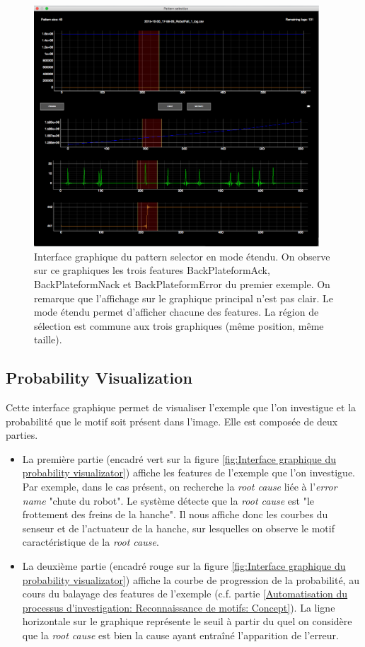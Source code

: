 \begin{figure}[H]
	\centering\includegraphics[height=9cm]{images/pattern_selector_ext.png}
	\caption[Interface graphique du pattern selector en mode étendu]{Interface graphique du pattern selector en mode étendu. On observe sur ce graphiques les trois features BackPlateformAck, BackPlateformNack et BackPlateformError du premier exemple. On remarque que l'affichage sur le graphique principal n'est pas clair. Le mode étendu permet d'afficher chacune des features. La région de sélection est commune aux trois graphiques (même position, même taille).}
	\label{fig:Interface graphique du pattern selector en mode étendu}
\end{figure}

\subsection{Probability Visualization}
\label{Industrialisation du produit: Outils graphiques: Probability Visualization}
Cette interface graphique permet de visualiser l'exemple que l'on investigue et la probabilité que le motif soit présent dans l'image. Elle est composée de deux parties. 
\begin{itemize}
	\item La première partie (encadré vert sur la figure \ref{fig:Interface graphique du probability visualizator}) affiche les features de l'exemple que l'on investigue. Par exemple, dans le cas présent, on recherche la \emph{root cause} liée à l'\emph{error name} "chute du robot". Le système détecte que la \emph{root cause} est "le frottement des freins de la hanche". Il nous affiche donc les courbes du senseur et de l'actuateur de la hanche, sur lesquelles on observe le motif caractéristique de la \emph{root cause}. 
	\item La deuxième partie (encadré rouge sur la figure \ref{fig:Interface graphique du probability visualizator}) affiche la courbe de progression de la probabilité, au cours du balayage des features de l'exemple (c.f. partie \ref{Automatisation du processus d'investigation: Reconnaissance de motifs: Concept}). La ligne horizontale sur le graphique représente le seuil à partir du quel on considère que la \emph{root cause} est bien la cause ayant entraîné l'apparition de l'erreur.
\end{itemize}


